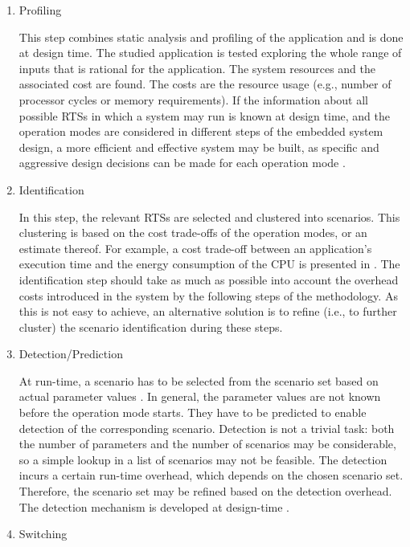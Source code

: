 \begin{enumerate}

\item Profiling 

This step combines static analysis and profiling of the application and is done at design time.
The studied application is tested exploring the whole range of inputs that is rational for the application.
The system resources and the associated cost are found.
The costs are the resource usage (e.g., number of processor cycles or memory requirements).
 If the information about all possible RTSs in which a system may run is known at design time, and the operation modes are considered in different steps of the embedded system design, a more efficient and effective system may be built, as specific and aggressive design decisions can be made for each operation mode \cite{Gheorghita2007}.

\item Identification

In this step, the relevant RTSs are selected and clustered into scenarios. 
This clustering is based on the cost trade-offs of the operation modes, or an estimate thereof.
For example, a cost trade-off between an application's execution time and the energy consumption of the CPU is presented in \cite{Elena2010}.
The identification step should take as much as possible into account the overhead costs introduced in the system by the following steps of the methodology. 
As this is not easy to achieve, an alternative solution is to refine (i.e., to further cluster) the scenario identification during these steps. 

\item Detection/Prediction 

At run-time, a scenario has to be selected from the scenario set based on actual parameter values \cite{GheoThesis}. 
In general, the parameter values are not known before the operation mode starts. They have to be predicted to enable detection of the corresponding scenario. 
Detection is not a trivial task: both the number of parameters and the number of scenarios may be considerable, so a simple lookup in a list of scenarios may not be feasible. 
The detection incurs a certain run-time overhead, which depends on the chosen scenario set. 
Therefore, the scenario set may be refined based on the detection overhead. 
The detection mechanism is developed at design-time \cite{tcm}.

\item Switching


\end{enumerate}
